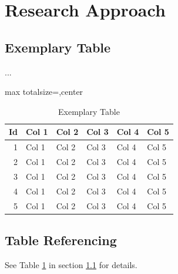 \section{Research Approach}
\label{sec:research_approach}

\subsection{Exemplary Table}
\label{subsec:tab}
...

\begin{table}[htbp]
\caption{Exemplary Table}
\label{tab:tab_name}
\begin{center}
\begin{adjustbox}{max totalsize={\columnwidth}{\textheight},center}
\begin{tabular}{rlllll}
\toprule
\textbf{Id} & \textbf{Col 1 } & \textbf{Col 2} & \textbf{Col 3} & \textbf{Col 4} & \textbf{Col 5} \\
\midrule
1 & Col 1 & Col 2 & Col 3 & Col 4 & Col 5 \\
2 & Col 1 & Col 2 & Col 3 & Col 4 & Col 5 \\
3 & Col 1 & Col 2 & Col 3 & Col 4 & Col 5 \\
4 & Col 1 & Col 2 & Col 3 & Col 4 & Col 5 \\
5 & Col 1 & Col 2 & Col 3 & Col 4 & Col 5 \\
\bottomrule
\end{tabular}
\end{adjustbox}
\end{center}
\end{table}

\subsection{Table Referencing}
\label{subsec:tab_rfs}

See Table \ref{tab:tab_name} in section \ref{subsec:tab} for details.